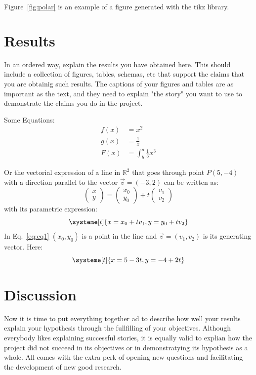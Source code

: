 \documentclass[12pt,twoside]{article}
\begin{document}
Figure~\ref{fig:polar} is an example of a figure generated with the tikz library. 


\clearpage
\section{Results}

In an ordered way, explain the results you have obtained here. This should include a collection of figures, tables, schemas, etc that support the claims that you are obtainig such results. The captions of your figures and tables are as important as the text, and they need to explain "the story" you want to use to demonstrate the claims you do in the project.

Some Equations:
\begin{align*}
    f(x) &= x^2\\
    g(x) &= \frac{1}{x}\\
    F(x) &= \int^a_b \frac{1}{3}x^3
  \end{align*}

Or the vectorial expression of a line in $\mathbb{R}^2$ that goes through point $P(5,-4)$ with a direction parallel to the vector $\vec{v}=(-3,2)$ can be written as:
  \[
  \begin{pmatrix}x\\y\end{pmatrix}=
  \begin{pmatrix}x_0\\y_0\end{pmatrix}+
  t\begin{pmatrix}v_1\\v_2\end{pmatrix}
\]
with its parametric expression:
\begin{equation}
\systeme[t]{x=x_0+t v_1, y=y_0+t v_2}
\label{eq:eq1}
\end{equation}
In Eq.~\ref{eq:eq1} $(x_0,y_0)$ is a point in the line and $\vec{v}=(v_1,v_2)$ is its generating vector. Here:
\[
\systeme[t]{x=5-3t, y=-4+2t}
\]



\clearpage
\section{Discussion}

Now it is time to put everything together ad to describe how well your results explain your hypothesis through the fullfilling of your objectives. Although everybody likes explaining successful stories, it is equally valid to explian how the project did not succeed in its objectives or in demonstratying its hypothesis as a whole. All comes with the extra perk of opening new questions and facilitating the development of new good research.
\end{document}
